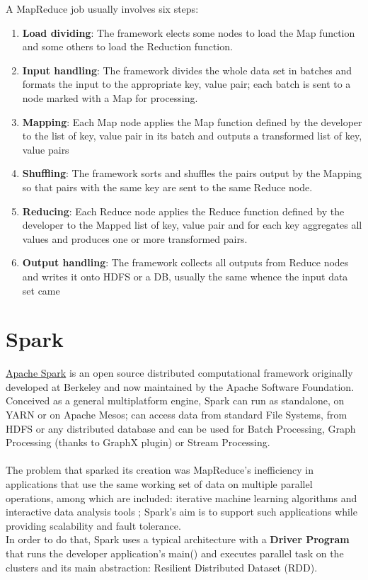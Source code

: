 A MapReduce job usually involves six steps:

\begin{enumerate}
	\item \textbf{Load dividing}: The framework elects some nodes to load the Map function and some others to load the Reduction function.
	\item \textbf{Input handling}: The framework divides the whole data set in batches and formats the input to the appropriate key, value pair; each batch is sent to a node marked with a Map for processing.
	\item \textbf{Mapping}: Each Map node applies the Map function defined by the developer to the list of key, value pair in its batch and outputs a transformed list of key, value pairs
	\item \textbf{Shuffling}: The framework sorts and shuffles the pairs output by the Mapping so that pairs with the same key are sent to the same Reduce node.
	\item \textbf{Reducing}: Each Reduce node applies the Reduce function defined by the developer to the Mapped list of key, value pair and for each key aggregates all values and produces one or more transformed pairs.
	\item \textbf{Output handling}: The framework collects all outputs from Reduce nodes and writes it onto HDFS or a DB, usually the same whence the input data set came
\end{enumerate}

 \pagebreak
 
\section{Spark} \label{Spark}

\href{https://spark.apache.org/}{Apache Spark} \cite{spark_doc} is an open source distributed computational framework originally developed at Berkeley and now maintained by the Apache Software Foundation.
\\
Conceived as a general multiplatform engine, Spark can run as standalone, on YARN or on Apache Mesos; can access data from standard File Systems, from HDFS or any distributed database and can be used for Batch Processing, Graph Processing (thanks to GraphX plugin) or Stream Processing.
\\
\\
The problem that sparked its creation was MapReduce's inefficiency in applications that use the same working set of data on multiple parallel operations, among which are included: iterative machine learning algorithms and interactive data analysis tools \cite{Zaharia:2010:SCC:1863103.1863113}; Spark's aim is to support such applications while providing scalability and fault tolerance.
\\
In order to do that, Spark uses a typical architecture with a \textbf{Driver Program} that runs the developer application's main() and executes parallel task on the clusters and its main abstraction: Resilient Distributed Dataset (RDD).

